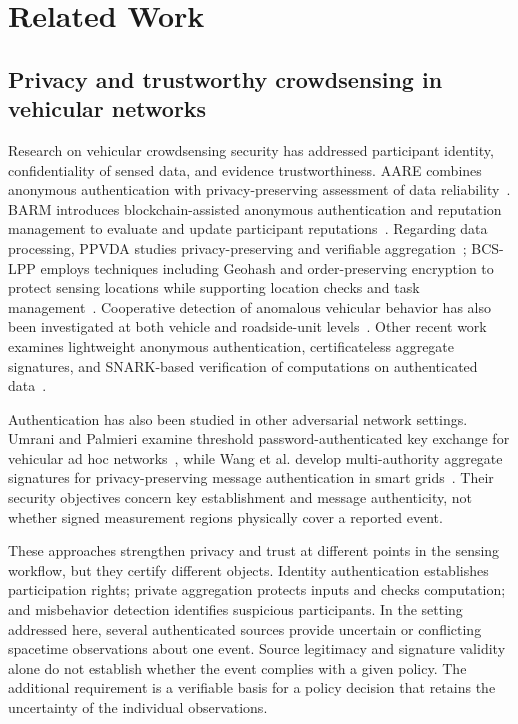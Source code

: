 \section{Related Work}
\subsection{Privacy and trustworthy crowdsensing in vehicular networks}
Research on vehicular crowdsensing security has addressed participant identity, confidentiality of sensed data, and evidence trustworthiness. AARE combines anonymous authentication with privacy-preserving assessment of data reliability~\cite{Cheng2023}. BARM introduces blockchain-assisted anonymous authentication and reputation management to evaluate and update participant reputations~\cite{Zheng2025BARM}. Regarding data processing, PPVDA studies privacy-preserving and verifiable aggregation~\cite{Zhou2024}; BCS-LPP employs techniques including Geohash and order-preserving encryption to protect sensing locations while supporting location checks and task management~\cite{Shen2024}. Cooperative detection of anomalous vehicular behavior has also been investigated at both vehicle and roadside-unit levels~\cite{Sultana2024}. Other recent work examines lightweight anonymous authentication, certificateless aggregate signatures, and SNARK-based verification of computations on authenticated data~\cite{Imam2025JISA,Wang2025JISA,Reinhart2026ADSC}.

Authentication has also been studied in other adversarial network settings. Umrani and Palmieri examine threshold password-authenticated key exchange for vehicular ad hoc networks~\cite{CybersecUmrani2025}, while Wang et al. develop multi-authority aggregate signatures for privacy-preserving message authentication in smart grids~\cite{CybersecWang2026}. Their security objectives concern key establishment and message authenticity, not whether signed measurement regions physically cover a reported event.

These approaches strengthen privacy and trust at different points in the sensing workflow, but they certify different objects. Identity authentication establishes participation rights; private aggregation protects inputs and checks computation; and misbehavior detection identifies suspicious participants. In the setting addressed here, several authenticated sources provide uncertain or conflicting spacetime observations about one event. Source legitimacy and signature validity alone do not establish whether the event complies with a given policy. The additional requirement is a verifiable basis for a policy decision that retains the uncertainty of the individual observations.

